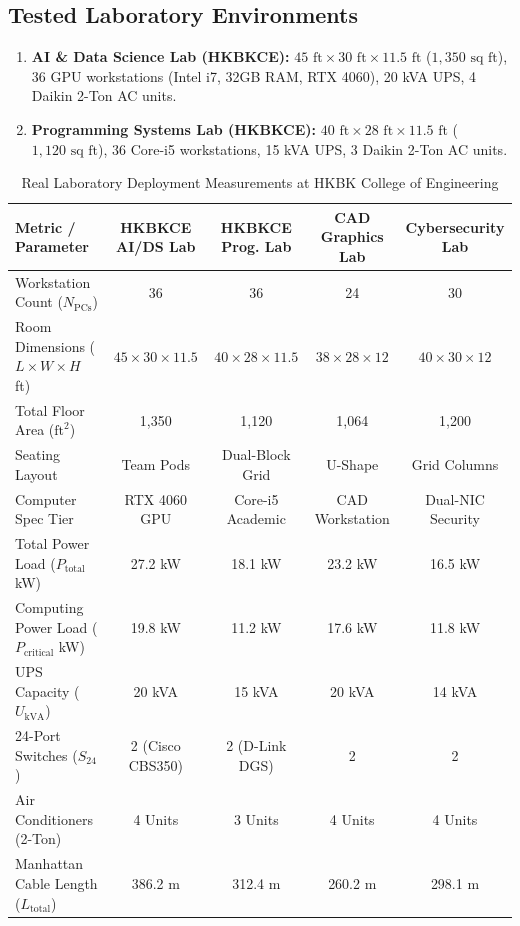 \documentclass[conference]{IEEEtran}
\begin{document}
\subsection{Tested Laboratory Environments}
\begin{enumerate}
    \item \textbf{AI \& Data Science Lab (HKBKCE):} $45\text{ ft} \times 30\text{ ft} \times 11.5\text{ ft}$ ($1,350\text{ sq ft}$), 36 GPU workstations (Intel i7, 32GB RAM, RTX 4060), 20 kVA UPS, 4 Daikin 2-Ton AC units.
    \item \textbf{Programming Systems Lab (HKBKCE):} $40\text{ ft} \times 28\text{ ft} \times 11.5\text{ ft}$ ($1,120\text{ sq ft}$), 36 Core-i5 workstations, 15 kVA UPS, 3 Daikin 2-Ton AC units.
\end{enumerate}

\begin{table}[t]
\caption{Real Laboratory Deployment Measurements at HKBK College of Engineering}
\label{tab:benchmark_results}
\centering
\begin{tabular}{lcccc}
\toprule
\textbf{Metric / Parameter} & \textbf{HKBKCE AI/DS Lab} & \textbf{HKBKCE Prog. Lab} & \textbf{CAD Graphics Lab} & \textbf{Cybersecurity Lab} \\
\midrule
Workstation Count ($N_{\text{PCs}}$) & 36 & 36 & 24 & 30 \\
Room Dimensions ($L \times W \times H$ ft) & $45 \times 30 \times 11.5$ & $40 \times 28 \times 11.5$ & $38 \times 28 \times 12$ & $40 \times 30 \times 12$ \\
Total Floor Area ($\text{ft}^2$) & 1,350 & 1,120 & 1,064 & 1,200 \\
Seating Layout & Team Pods & Dual-Block Grid & U-Shape & Grid Columns \\
Computer Spec Tier & RTX 4060 GPU & Core-i5 Academic & CAD Workstation & Dual-NIC Security \\
\midrule
Total Power Load ($P_{\text{total}}$ kW) & 27.2 kW & 18.1 kW & 23.2 kW & 16.5 kW \\
Computing Power Load ($P_{\text{critical}}$ kW) & 19.8 kW & 11.2 kW & 17.6 kW & 11.8 kW \\
UPS Capacity ($U_{\text{kVA}}$) & 20 kVA & 15 kVA & 20 kVA & 14 kVA \\
24-Port Switches ($S_{24}$) & 2 (Cisco CBS350) & 2 (D-Link DGS) & 2 & 2 \\
Air Conditioners (2-Ton) & 4 Units & 3 Units & 4 Units & 4 Units \\
\midrule
Manhattan Cable Length ($L_{\text{total}}$) & 386.2 m & 312.4 m & 260.2 m & 298.1 m \\

\end{tabular}
\end{table}
\end{document}
